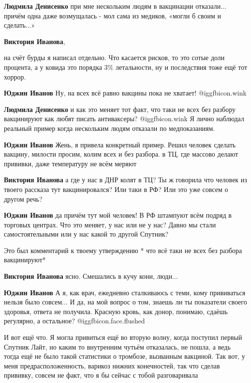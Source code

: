 \begin{itemize}
\begin{itemize}
\textbf{Людмила Денисенко} при мне нескольким людям в вакцинации отказали... причём одна даже возмущалась - мол сама из медиков, «могли б своим и сделать...»

\textbf{Виктория Иванова}, 

на счёт бурды я написал отдельно. Что касается рисков, то это сотые доли
процента, а у ковида это порядка 3\% летальности, ну и последствия тоже ещё тот
хоррор.

\textbf{Юджин Иванов} Ну, на всех всё равно вакцины пока не хватает!  @igg{fbicon.wink} 

\textbf{Людмила Денисенко} и как это меняет тот факт, что таки не всех без разбору вакцинируют как любят писать антиваксеры?  @igg{fbicon.wink}  Я лично наблюдал реальный пример когда нескольким людям отказали по медпоказаниям.

\textbf{Юджин Иванов} Жень, я привела конкретный пример. Решил человек сделать вакцину, милости просим, колим всех и без разбора. в ТЦ, где массово делают прививки, даже температуру не всём меряют

\textbf{Виктория Иванова} а где у нас в ДНР колят в ТЦ? Ты ж говорила что человек из твоего рассказа тут вакцинировался? Или таки в РФ? Или это уже совсем о другом речь?

\textbf{Юджин Иванов} да причём тут мой человек! В РФ штампуют всём подряд в торговых центрах. Что это меняет, у нас или не у нас? Давно мы стали самостоятельными или у нас какой то другой Спутник?

Это был комментарий к твоему утверждению * что всё таки не всех без разбора вакцинируют*

\textbf{Виктория Иванова} ясно. Смешались в кучу кони, люди...

\textbf{Юджин Иванов} А я, как врач, ежедневно сталкиваюсь с теми, кому прививаться нельзя было совсем... И да, на мой вопрос о том, знаешь ли ты показатели своего здоровья, ответа не получила. Красную кровь, как донор, понимаю, сдаёшь регулярно, а остальное?  @igg{fbicon.face.flushed} 


И вот ещё что. Я могла привиться ещё во вторую волну, когда поступил первый
Спутник Лайт, но каким то внутренним чутьём отказалась, не пошла, а ведь тогда
ещё не было такой статистики о тромбозе, вызванным вакциной. Так вот, у меня
предрасположенность, варикоз нижних конечностей, так что сделав прививку,
совсем не факт, что я бы сейчас с тобой разговаривала


\end{itemize}
\end{itemize}
